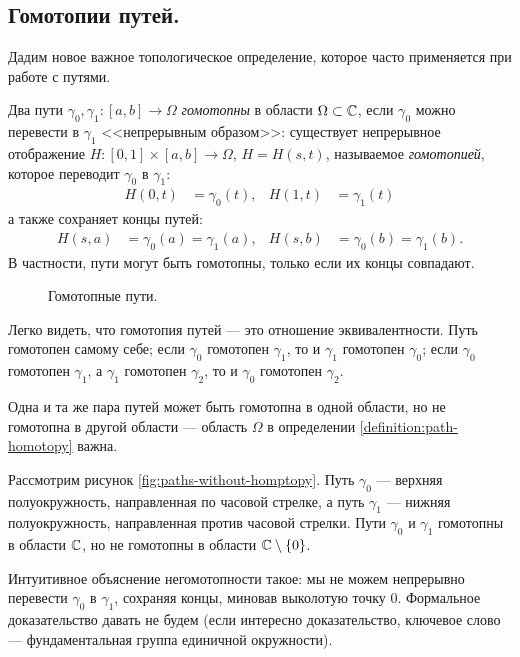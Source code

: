 \documentclass[../complex-analysis.tex]{subfiles}
\begin{document}
\subsection{Гомотопии путей.}

Дадим новое важное топологическое определение, которое часто применяется при работе с путями.

\begin{df}
 \label{definition:path-homotopy}
 Два пути $ \gamma_0,\gamma_1\colon [a,b] \to \Omega$ \textit{гомотопны} в области $ \Omega \subset \mathbb{C} $, если $ \gamma_0 $ можно перевести в $ \gamma_1 $ <<непрерывным образом>>: существует непрерывное отображение $ H \colon [0,1] \times [a,b] \to \Omega $, $ H = H(s,t) $, называемое \textit{гомотопией}, которое переводит $ \gamma_0 $ в $ \gamma_1 $:
 \begin{align*}
  H(0, t) &= \gamma_0(t), & H(1,t)&=\gamma_1(t)
 \end{align*} а также сохраняет концы путей:
 \begin{align*}
  H(s, a) &= \gamma_0(a) = \gamma_1(a), & H(s,b) &= \gamma_0(b) = \gamma_1(b).
 \end{align*} В частности, пути могут быть гомотопны, только если их концы совпадают.
\end{df}

\begin{figure}[ht]
 \centering
 \caption{Гомотопные пути.}
 \label{fig:path-homptopy}
\end{figure}

\begin{remrk*}
 Легко видеть, что гомотопия путей --- это отношение эквивалентности. Путь гомотопен самому себе; если $ \gamma_0 $ гомотопен $ \gamma_1 $, то и $ \gamma_1 $ гомотопен $ \gamma_0 $; если $ \gamma_0 $ гомотопен $ \gamma_1 $, а $ \gamma_1 $ гомотопен $ \gamma_2 $, то и $ \gamma_0 $ гомотопен $ \gamma_2 $.
\end{remrk*}

\begin{exmpl}
 \label{example:non_homotopy_paths}
 Одна и та же пара путей может быть гомотопна в одной области, но не гомотопна в другой области --- область $\Omega$ в определении \ref{definition:path-homotopy} важна.

 Рассмотрим рисунок \ref{fig:paths-without-homptopy}. Путь $\gamma_0$ --- верхняя полуокружность, направленная по часовой стрелке, а путь $\gamma_1$ ---  нижняя полуокружность, направленная против часовой стрелки. Пути $\gamma_0$ и $\gamma_1$ гомотопны в области $\mathbb{C}$, но не гомотопны в области $\mathbb{C} \setminus \left\{ 0 \right\}$.

 Интуитивное объяснение негомотопности такое: мы не можем непрерывно перевести $\gamma_0$ в $\gamma_1$, сохраняя концы, миновав выколотую точку $0$. Формальное доказательство давать не будем (если интересно доказательство, ключевое слово --- фундаментальная группа единичной окружности).
\end{exmpl}
\end{document}
